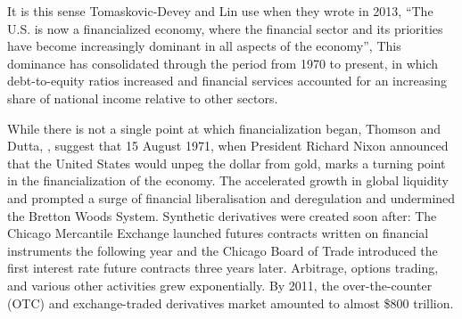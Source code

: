 It is this sense  Tomaskovic-Devey and Lin use when they wrote in 2013, ``The U.S. is now a financialized economy, where the financial sector and its priorities have become increasingly dominant in all aspects of the economy''\cite{tomaskovic-deveyFinancializationCausesInequality2013}, 
This dominance has consolidated through %
the period from 1970 to present, in which debt-to-equity ratios increased and financial services accounted for an increasing share of national income relative to other sectors. %




While there is not a single point at which financialization began, Thomson and Dutta,  \cite{thomsonFinancialisationPrimer2018}, suggest that 15 August 1971, when President Richard Nixon announced that the United States would unpeg the dollar from gold, marks a turning point in the financialization of the economy. The accelerated growth in global liquidity and prompted a surge of financial liberalisation and deregulation and undermined the Bretton Woods System.  Synthetic derivatives were created soon after: The Chicago Mercantile Exchange launched futures contracts written on financial instruments the following year and the Chicago Board of Trade introduced the first interest rate future contracts three years later. Arbitrage, options trading, and various other activities grew exponentially. By 2011, the over-the-counter (OTC) and exchange-traded derivatives market amounted to almost \$800 trillion.  %

